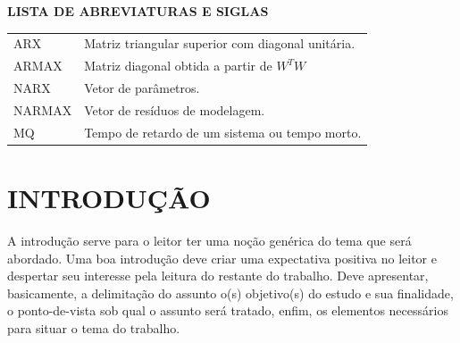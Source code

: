 \documentclass[a4paper,12pt]{article}
\begin{document}
\newpage


\thispagestyle{empty}

\begin{center}
{\large \textbf{LISTA DE ABREVIATURAS E SIGLAS}}
\end{center}

\vspace{3cm}

\begin{tabular}{ l l }
ARX\hspace{1.5cm} & Matriz triangular superior com diagonal unitária.\\
ARMAX\hspace{1.5cm} & Matriz diagonal obtida a partir de $W^{T}W$\\
NARX\hspace{1.5cm}&Vetor de parâmetros.\\
NARMAX\hspace{1.5cm}&Vetor de resíduos de modelagem.\\
MQ\hspace{1.5cm}&Tempo de retardo de um sistema ou tempo morto.\\
\end{tabular}

\newpage


\thispagestyle{empty}

\begin{center}
\listoffigures
\end{center}

\newpage


\thispagestyle{empty}

\begin{center}
\tableofcontents
\end{center}

\newpage


\thispagestyle{main}

\section{INTRODUÇÃO}

\begin{flushleft}
\hspace{4ex}A introdução serve para o leitor ter uma noção genérica do tema que será
abordado. Uma boa introdução deve criar uma expectativa positiva no leitor e despertar
seu interesse pela leitura do restante do trabalho. Deve apresentar, basicamente, a
delimitação do assunto o(s) objetivo(s) do estudo e sua finalidade, o ponto-de-vista sob
qual o assunto será tratado, enfim, os elementos necessários para situar o tema do
trabalho.
\end{flushleft}
\end{document}
